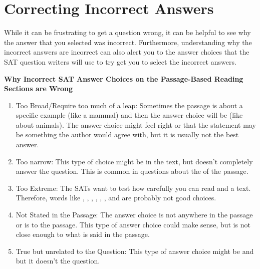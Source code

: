 \section{Correcting Incorrect Answers}

While it can be frustrating to get a question wrong, it can be helpful to see why the answer that
you selected was incorrect. Furthermore, understanding why the incorrect answers are incorrect
can also alert you to the answer choices that the SAT question writers will use to try get you to
select the incorrect answers.


\textbf{Why Incorrect SAT Answer Choices on the Passage-Based Reading Sections are
Wrong}

\begin{enumerate}
\item Too Broad/Require too much of a leap: Sometimes the passage is about a specific
example (like a mammal) and then the answer choice will be \hrulefill
(like about animals). The answer choice might feel right or that the statement may be
something the author would agree with, but it is usually not the best answer.

\item Too narrow: This type of choice might be in the text, but \underline{\hspace{2in}}
doesn't completely answer the question. This is common in questions about the \underline{\hspace{2in}}
of the passage.

\item Too Extreme: The SATs want to test how carefully you can read and
a text. Therefore, words like , \underline{\hspace{2in}}, \underline{\hspace{2in}}, \underline{\hspace{2in}}, \underline{\hspace{2in}}, \underline{\hspace{2in}}, and \underline{\hspace{2in}} are probably not good choices.

\item Not Stated in the Passage: The answer choice is not \underline{\hspace{2in}} anywhere in the passage or is \underline{\hspace{2in}} to the passage. This type of answer choice could make sense, but is not close enough to what is said in the passage.

\item True but unrelated to the Question: This type of answer choice might be \underline{\hspace{2in}}
and \underline{\hspace{2in}} but it doesn't \hrulefill the question.

\end{enumerate}

